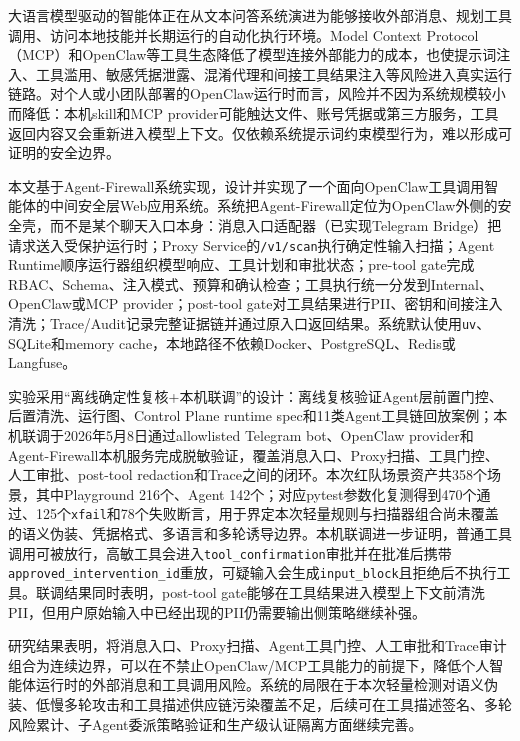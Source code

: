 \documentclass[UTF8,zihao=-4,scheme=chinese,fontset=none]{ctexart}
\newcommand{\kaitifont}{\CJKfamily{zhkai}}
\newcommand{\code}[1]{{\ttfamily\small\nolinkurl{#1}}}
\newenvironment{cnabstract}{\kaitifont}{\par}
\begin{document}
\begin{cnabstract}
大语言模型驱动的智能体正在从文本问答系统演进为能够接收外部消息、规划工具调用、访问本地技能并长期运行的自动化执行环境。Model Context Protocol（MCP）和OpenClaw等工具生态降低了模型连接外部能力的成本，也使提示词注入、工具滥用、敏感凭据泄露、混淆代理和间接工具结果注入等风险进入真实运行链路。对个人或小团队部署的OpenClaw运行时而言，风险并不因为系统规模较小而降低：本机skill和MCP provider可能触达文件、账号凭据或第三方服务，工具返回内容又会重新进入模型上下文。仅依赖系统提示词约束模型行为，难以形成可证明的安全边界。

本文基于Agent-Firewall系统实现，设计并实现了一个面向OpenClaw工具调用智能体的中间安全层Web应用系统。系统把Agent-Firewall定位为OpenClaw外侧的安全壳，而不是某个聊天入口本身：消息入口适配器（已实现Telegram Bridge）把请求送入受保护运行时；Proxy Service的\code{/v1/scan}执行确定性输入扫描；Agent Runtime顺序运行器组织模型响应、工具计划和审批状态；pre-tool gate完成RBAC、Schema、注入模式、预算和确认检查；工具执行统一分发到Internal、OpenClaw或MCP provider；post-tool gate对工具结果进行PII、密钥和间接注入清洗；Trace/Audit记录完整证据链并通过原入口返回结果。系统默认使用\code{uv}、SQLite和memory cache，本地路径不依赖Docker、PostgreSQL、Redis或Langfuse。

实验采用“离线确定性复核+本机联调”的设计：离线复核验证Agent层前置门控、后置清洗、运行图、Control Plane runtime spec和11类Agent工具链回放案例；本机联调于2026年5月8日通过allowlisted Telegram bot、OpenClaw provider和Agent-Firewall本机服务完成脱敏验证，覆盖消息入口、Proxy扫描、工具门控、人工审批、post-tool redaction和Trace之间的闭环。本次红队场景资产共358个场景，其中Playground 216个、Agent 142个；对应pytest参数化复测得到470个通过、125个\code{xfail}和78个失败断言，用于界定本次轻量规则与扫描器组合尚未覆盖的语义伪装、凭据格式、多语言和多轮诱导边界。本机联调进一步证明，普通工具调用可被放行，高敏工具会进入\code{tool\_confirmation}审批并在批准后携带\code{approved\_intervention\_id}重放，可疑输入会生成\code{input\_block}且拒绝后不执行工具。联调结果同时表明，post-tool gate能够在工具结果进入模型上下文前清洗PII，但用户原始输入中已经出现的PII仍需要输出侧策略继续补强。

研究结果表明，将消息入口、Proxy扫描、Agent工具门控、人工审批和Trace审计组合为连续边界，可以在不禁止OpenClaw/MCP工具能力的前提下，降低个人智能体运行时的外部消息和工具调用风险。系统的局限在于本次轻量检测对语义伪装、低慢多轮攻击和工具描述供应链污染覆盖不足，后续可在工具描述签名、多轮风险累计、子Agent委派策略验证和生产级认证隔离方面继续完善。
\end{cnabstract}
\end{document}
